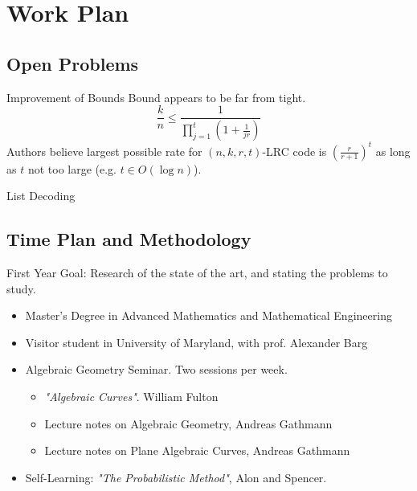 \section{Work Plan}
\subsection{Open Problems}

\begin{frame}{Improvement of Bounds}
Bound appears to be far from tight.
$$ \frac{k}{n} \leq \frac{1}{\prod_{j=1}^{t} (1 + \frac{1}{jr} )} $$
Authors believe largest possible rate for $(n,k,r,t)$-LRC code is $\left(\frac{r}{r+1}\right)^t$ as long as $t$ not too large (e.g. $t\in O(\log n)$).
\end{frame}

\begin{frame}{List Decoding}

\end{frame}

\subsection{Time Plan and Methodology}
\begin{frame}{First Year}
Goal: Research of the state of the art, and stating the problems to study.
\begin{itemize}
\item Master's Degree in Advanced Mathematics and Mathematical Engineering
\item Visitor student in University of Maryland, with prof. Alexander Barg
\item Algebraic Geometry Seminar. Two sessions per week.
\begin{itemize}
\item \textit{"Algebraic Curves"}. William Fulton
\item Lecture notes on Algebraic Geometry, Andreas Gathmann
\item Lecture notes on Plane Algebraic Curves, Andreas Gathmann
\end{itemize}
\item Self-Learning: \textit{"The Probabilistic Method"}, Alon and Spencer.
\end{itemize}
\end{frame}

